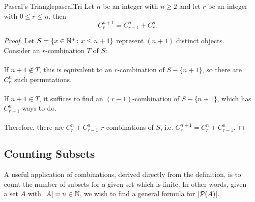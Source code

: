 \documentclass[math]{amznotes}
\theoremstyle{remark}
\begin{document}
\begin{thmbox}{Pascal's Triangle}{pascalTri}
    Let $n$ be an integer with $n \geq 2$ and let $r$ be an integer with $0 \leq r \leq n$, then
    \begin{equation*}
        C^{n + 1}_r = C^{n}_{r - 1} + C^{n}_r.
    \end{equation*}
    \tcblower
    \begin{proof}
        Let $S = \left\{x \in \mathbb{N}^+ \colon x \leq n + 1\right\}$ represent $(n + 1)$ distinct objects. Consider an $r$-combination $T$ of $S$:
        \\\\
        If $n + 1 \notin T$, this is equivalent to an $r$-combination of $S - \{n + 1\}$, so there are $C^n_r$ such permutations.
        \\\\
        If $n + 1 \in T$, it suffices to find an $(r - 1)$-combination of $S - \{n + 1\}$, which has $C^n_{r - 1}$ ways to do.
        \\\\
        Therefore, there are $C^n_{r} + C^n_{r - 1}$ $r$-combinations of $S$, i.e. $C^{n + 1}_r = C^n_r + C^n_{r - 1}$. 
    \end{proof}
\end{thmbox}
\subsection{Counting Subsets}
A useful application of combinations, derived directly from the definition, is to count the number of subsets for a given set which is finite. In other words, given a set $A$ with ${\left\lvert {A} \right\rvert} = n \in \mathbb{N}$, we wish to find a general formula for ${\left\lvert {\mathcal{P}(A)} \right\rvert}$.
\end{document}
